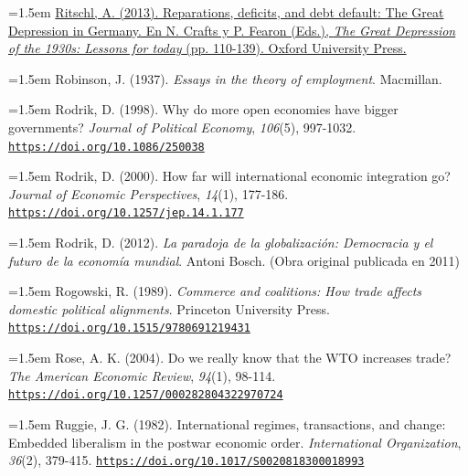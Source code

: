 \documentclass[10pt,a4paper]{article}
\begin{document}
{\sloppy\noindent\hangindent=1.5em \href{https://researchonline.lse.ac.uk/id/eprint/60161}{Ritschl, A. (2013). Reparations, deficits, and debt default: The Great Depression in Germany. En N. Crafts y P. Fearon (Eds.), \textit{The Great Depression of the 1930s: Lessons for today} (pp. 110-139). Oxford University Press.}\par}

\noindent\hangindent=1.5em Robinson, J. (1937). \textit{Essays in the theory of employment}. Macmillan.

{\sloppy\noindent\hangindent=1.5em Rodrik, D. (1998). Why do more open economies have bigger governments? \textit{Journal of Political Economy}, \textit{106}(5), 997-1032. \href{https://doi.org/10.1086/250038}{\nolinkurl{https://doi.org/10.1086/250038}}\par}

{\sloppy\noindent\hangindent=1.5em Rodrik, D. (2000). How far will international economic integration go? \textit{Journal of Economic Perspectives}, \textit{14}(1), 177-186. \href{https://doi.org/10.1257/jep.14.1.177}{\nolinkurl{https://doi.org/10.1257/jep.14.1.177}}\par}

\noindent\hangindent=1.5em Rodrik, D. (2012). \textit{La paradoja de la globalización: Democracia y el futuro de la economía mundial}. Antoni Bosch. (Obra original publicada en 2011)

{\sloppy\noindent\hangindent=1.5em Rogowski, R. (1989). \textit{Commerce and coalitions: How trade affects domestic political alignments}. Princeton University Press. \href{https://doi.org/10.1515/9780691219431}{\nolinkurl{https://doi.org/10.1515/9780691219431}}\par}

{\sloppy\noindent\hangindent=1.5em Rose, A. K. (2004). Do we really know that the WTO increases trade? \textit{The American Economic Review}, \textit{94}(1), 98-114. \href{https://doi.org/10.1257/000282804322970724}{\nolinkurl{https://doi.org/10.1257/000282804322970724}}\par}

{\sloppy\noindent\hangindent=1.5em Ruggie, J. G. (1982). International regimes, transactions, and change: Embedded liberalism in the postwar economic order. \textit{International Organization}, \textit{36}(2), 379-415. \href{https://doi.org/10.1017/S0020818300018993}{\nolinkurl{https://doi.org/10.1017/S0020818300018993}}\par}
\end{document}
